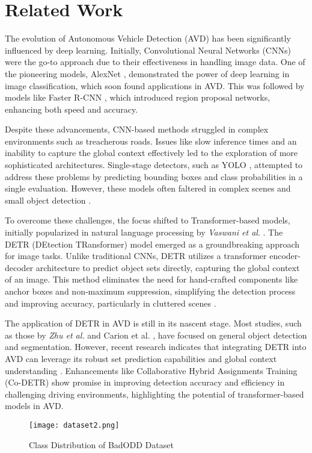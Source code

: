 \section{Related Work}
The evolution of Autonomous Vehicle Detection (AVD) has been significantly influenced by deep learning. Initially, Convolutional Neural Networks (CNNs) were the go-to approach due to their effectiveness in handling image data. One of the pioneering models, AlexNet \cite{krizhevsky2012imagenet}, demonstrated the power of deep learning in image classification, which soon found applications in AVD. This was followed by models like Faster R-CNN \cite{ren2015faster}, which introduced region proposal networks, enhancing both speed and accuracy.

Despite these advancements, CNN-based methods struggled in complex environments such as treacherous roads. Issues like slow inference times and an inability to capture the global context effectively led to the exploration of more sophisticated architectures. Single-stage detectors, such as YOLO \cite{redmon2016you}, attempted to address these problems by predicting bounding boxes and class probabilities in a single evaluation. However, these models often faltered in complex scenes and small object detection \cite{liu2016ssd}.

To overcome these challenges, the focus shifted to Transformer-based models, initially popularized in natural language processing by \textit{Vaswani et al}. \cite{vaswani2017attention}. The DETR (DEtection TRansformer) model \cite{Carion2020DETR} emerged as a groundbreaking approach for image tasks. Unlike traditional CNNs, DETR utilizes a transformer encoder-decoder architecture to predict object sets directly, capturing the global context of an image. This method eliminates the need for hand-crafted components like anchor boxes and non-maximum suppression, simplifying the detection process and improving accuracy, particularly in cluttered scenes \cite{zhu2020deformable}.

The application of DETR in AVD is still in its nascent stage. Most studies, such as those by \textit{Zhu et al.} \cite{zhu2020deformable} and Carion et al. \cite{Carion2020DETR}, have focused on general object detection and segmentation. However, recent research indicates that integrating DETR into AVD can leverage its robust set prediction capabilities and global context understanding \cite{gao2021road}. Enhancements like Collaborative Hybrid Assignments Training (Co-DETR) show promise in improving detection accuracy and efficiency in challenging driving environments, highlighting the potential of transformer-based models in AVD.

    \begin{figure}[!htb]
        \centering
        \texttt{[image: dataset2.png]}
        \caption{Class Distribution of BadODD Dataset}
        \label{fig:class-dist}
    \end{figure}
    

